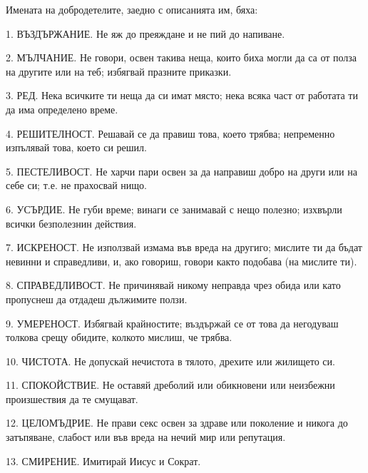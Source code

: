 \documentclass[12pt]{book}
\begin{document}
Имената на добродетелите, заедно с описанията им, бяха: 

1. ВЪЗДЪРЖАНИЕ. Не яж до преяждане и не пий до напиване.

2. МЪЛЧАНИЕ. Не говори, освен такива неща, които биха могли да са от полза на другите или на теб; избягвай празните приказки. 

3. РЕД. Нека всичките ти неща да си имат място; нека всяка част от работата ти да има определено време. 

4. РЕШИТЕЛНОСТ. Решавай се да правиш това, което трябва; непременно изпълявай това, което си решил.

5. ПЕСТЕЛИВОСТ. Не харчи пари освен за да направиш добро на други или на себе си; т.е. не прахосвай нищо.

6. УСЪРДИЕ. Не губи време; винаги се занимавай с нещо полезно; изхвърли всички безполезнин действия.

7. ИСКРЕНОСТ. Не използвай измама във вреда на другиго; мислите ти да бъдат невинни и справедливи, и, ако говориш, говори както подобава (на мислите ти).  

8. СПРАВЕДЛИВОСТ. Не причинявай никому неправда чрез обида или като пропуснеш да отдадеш дължимите ползи.

9. УМЕРЕНОСТ. Избягвай крайностите; въздържай се от това да негодуваш толкова срещу обидите, колкото мислиш, че трябва.

10. ЧИСТОТА. Не допускай нечистота в тялото, дрехите или жилището си.

11. СПОКОЙСТВИЕ. Не оставяй дреболий или обикновени или неизбежни произшествия да те смущават.

12. ЦЕЛОМЪДРИЕ. Не прави секс освен за здраве или поколение и никога до затъпяване, слабост или във вреда на нечий мир или репутация. 

13. СМИРЕНИЕ. Имитирай Иисус и Сократ.
\end{document}
